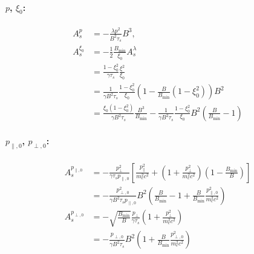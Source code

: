 \documentclass[11pt,a4paper]{article}
\newcommand{\sub}[1]{\ensuremath{_{\text{#1}}}}
\begin{document}
\paragraph{$p$, $\xi_0$:}
\begin{align}
A_s^p%
&= -\frac{\lambda p^2}{B^2\tau_s}B^3, \nonumber \\
A_s^{\xi_0} &= -\frac{1}{2}\frac{B\sub{min}}{\xi_0}A_s^{\lambda} \nonumber \\
&= \frac{1-\xi_0^2}{\gamma\tau_s} \frac{\xi^2}{\xi_0} \nonumber \\
&= \frac{1}{\gamma B^2 \tau_s} \frac{1-\xi_0^2}{\xi_0} \left(1-\frac{B}{B\sub{min}}(1-\xi_0^2)\right) B^2\nonumber \\
&= \frac{ \xi_0(1-\xi_0^2)}{\gamma B^2 \tau_s} \frac{B^3}{B\sub{min}} -  \frac{1}{\gamma B^2 \tau_s}\frac{1-\xi_0^2}{\xi_0}B^2\left(\frac{B}{B\sub{min}}-1\right) 
\end{align}

\paragraph{$p_{\parallel,0}$, $p_{\perp,0}$:}
\begin{align}
A_s^{p_{\parallel,0}} &= - \frac{p_\perp^2}{\gamma\tau_sp_{\parallel,0}} \left[\frac{p_\parallel^2}{m_e^2c^2}+\left(1+\frac{p_\perp^2}{m_e^2c^2}\right)\left(1-\frac{B\sub{min}}{B}\right)\right] \nonumber \\
&= -\frac{p_{\perp,0}^2}{\gamma B^2\tau_s p_{\parallel,0}}B^2\left(\frac{B}{B\sub{min}}-1 + \frac{B}{B\sub{min}}\frac{p_{\parallel,0}^2}{m_e^2 c^2}\right) \nonumber\\
A_s^{p_{\perp,0}} &= -\sqrt{\frac{B\sub{min}}{B}}\frac{p_\perp}{\gamma\tau_s}\left(1+\frac{p_\perp^2}{m_e^2c^2}\right) \nonumber \\
&=  -\frac{p_{\perp,0}}{\gamma B^2\tau_s}B^2\left(1+\frac{B}{B\sub{min}}\frac{p_{\perp,0}^2}{m_e^2c^2}\right) 
\end{align}
\end{document}
